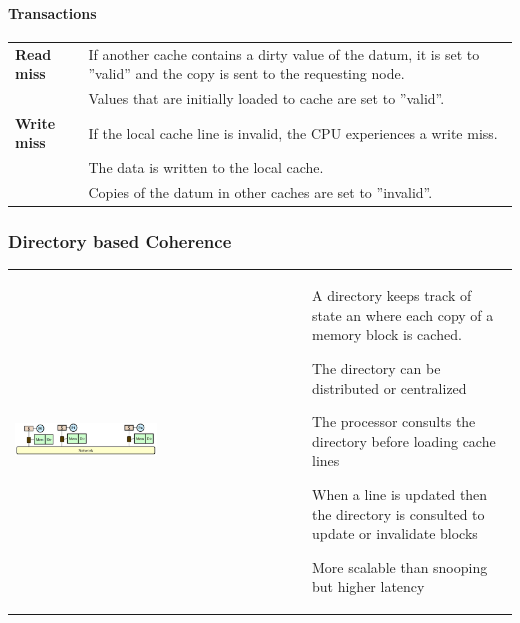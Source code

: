 			\paragraph{Transactions}
			
			\begin{tabular}{|>{\bfseries}p{}|p{}|}
				\hline
				Read miss
					& If another cache contains a dirty value of the datum, it is set to ''valid'' and the copy is sent to the requesting node.\\
					& Values that are initially loaded to cache are set to ''valid''.\\
				\hline
				Write miss
					& If the local cache line is invalid, the CPU experiences a write miss.\\
					& The data is written to the local cache.\\
					& Copies of the datum in other caches are set to ''invalid''.\\ 
				\hline
			\end{tabular}
		
		\subsubsection{Directory based Coherence }
			\begin{tabular}{p{0.475\textwidth}p{}}
				\vspace{0pt}
				
				\includegraphics[width=0.5\textwidth]{./pictures/directory.png}
						& A directory keeps track of state an where each copy of a memory block is cached.
					\begin{compactitem}
						\item The directory can be distributed or centralized
						\item The processor consults the directory before loading cache lines
						\item When a line is updated then the directory is consulted to update or invalidate blocks
						\item More scalable than snooping but higher latency
					\end{compactitem}
			\end{tabular}